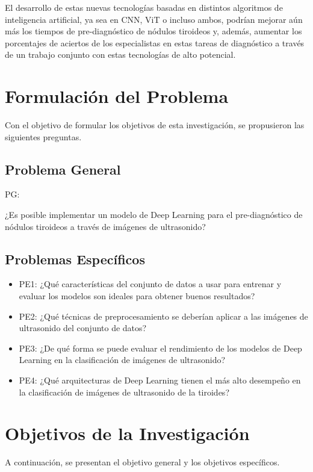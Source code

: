 El desarrollo de estas nuevas tecnologías basadas en distintos algoritmos de inteligencia artificial, ya sea en CNN, ViT o incluso ambos, podrían mejorar aún más los tiempos de pre-diagnóstico de nódulos tiroideos y, además, aumentar los porcentajes de aciertos de los especialistas en estas tareas de diagnóstico a través de un trabajo conjunto con estas tecnologías de alto potencial.



\section{Formulación del Problema}
Con el objetivo de formular los objetivos de esta investigación, se propusieron las siguientes preguntas.
\subsection{Problema General}
PG: \newcommand{\ProblemaGeneral}{
¿Es posible implementar un modelo de Deep Learning para el pre-diagnóstico de nódulos tiroideos a través de imágenes de ultrasonido?
}
\ProblemaGeneral
\subsection{Problemas Específicos}
\newcommand{\Pbone}{
¿Qué características del conjunto de datos a usar para entrenar y evaluar los modelos son ideales para obtener buenos resultados?
}
\newcommand{\Pbtwo}{
¿Qué técnicas de preprocesamiento se deberían aplicar a las imágenes de ultrasonido del conjunto de datos?
}
\newcommand{\Pbthree}{
¿De qué forma se puede evaluar el rendimiento de los modelos de Deep Learning en la clasificación de imágenes de ultrasonido?
}
\newcommand{\Pbfour}{
¿Qué arquitecturas de Deep Learning tienen el más alto desempeño en la clasificación de imágenes de ultrasonido de la tiroides?
}

\begin{itemize}
	\item PE1: {\Pbone}
	\item PE2: {\Pbtwo}
	\item PE3: {\Pbthree}
	\item PE4: {\Pbfour}
\end{itemize}

\section{Objetivos de la Investigación}
A continuación, se presentan el objetivo general y los objetivos específicos.
